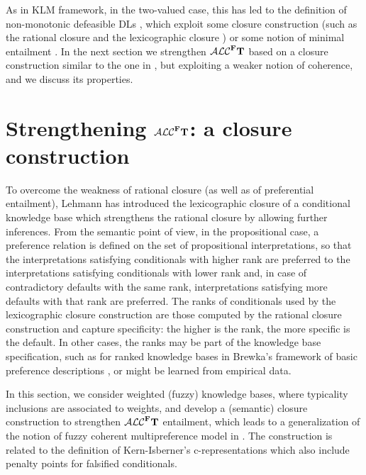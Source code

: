 \documentclass[runningheads]{llncs}
\newcommand{\tip}{{\bf T}}
\newcommand{\alcFt}{\mathcal{ALC}^{\Fe}\tip}
\newcommand {\Fe} {{\bf F}}
\begin{document}
As in KLM framework, in the two-valued case, this has led to the definition of 
non-monotonic defeasible DLs \cite{casinistraccia2010,CasiniDL2013,AIJ15,BonattiSauro17,Casinistraccia2012,AIJ21},  which exploit some closure construction (such as the rational closure   \cite{whatdoes} and the lexicographic closure \cite{Lehmann95}) or some notion of minimal entailment \cite{bonattilutz}. 
In the next section we strengthen $\alcFt$ based on a closure construction similar to the one in \cite{JELIA2021}, but exploiting a weaker notion of coherence, and we discuss its properties. 





\section{Strengthening $\alcFt$: a closure construction} \label{sec:closure}

To overcome the weakness of rational closure (as well as of preferential entailment), Lehmann has introduced the lexicographic closure of a conditional knowledge base \cite{Lehmann95} which strengthens the rational closure by allowing further inferences.
From the semantic point of view, in the propositional case, a preference relation is defined on the set of propositional interpretations, so that the interpretations satisfying conditionals with higher rank are preferred to the interpretations satisfying conditionals with lower rank and, 
in case of contradictory defaults with the same rank,  interpretations satisfying more defaults with that rank are preferred.
The ranks of conditionals used by the  lexicographic closure construction are those computed by the rational closure construction \cite{whatdoes} and capture  specificity:  the higher is the rank, the more specific is the default.
In other cases, the ranks may be part of the knowledge base specification, such as for ranked knowledge bases in Brewka's framework of basic preference descriptions  \cite{Brewka04}, or might be learned from empirical data. 

In this section, we consider weighted (fuzzy) knowledge bases, where typicality inclusions are associated to weights, 
and develop a (semantic) closure construction to strengthen $\alcFt$ entailment,
which leads to a generalization of the notion of fuzzy coherent multipreference model in \cite{JELIA2021}. 
The construction is related to the definition of Kern-Isberner's c-representations  \cite{Kern-Isberner01,Kern-Isberner2014} which also include penalty points  
for falsified conditionals.
\end{document}
